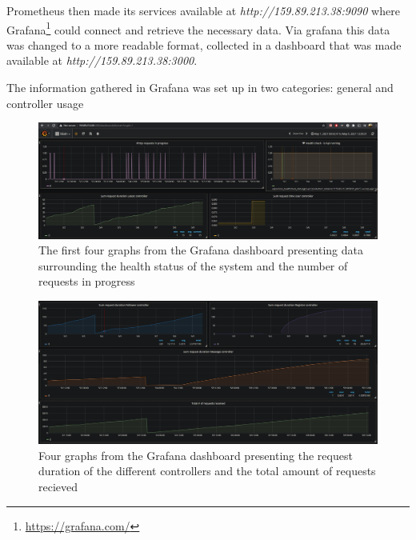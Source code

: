 \documentclass[report/main.tex]{subfiles}
\begin{document}
            Prometheus then made its services available at \textit{http://159.89.213.38:9090} where Grafana\footnote{\hyperlink{https://grafana.com/}{https://grafana.com/}} could connect and retrieve the necessary data. Via grafana this data was changed to a more readable format, collected in a dashboard that was made available at \textit{http://159.89.213.38:3000}.
            
            The information gathered in Grafana was set up in two categories: general and controller usage
                
            \begin{figure}[H]
                \centering
                \includegraphics[width=\textwidth]{report/images/Grafana EvilTwitter 1.jpg}
                \caption{The first four graphs from the Grafana dashboard presenting data surrounding the health status of the system and the number of requests in progress}
                \label{fig:grafana_setup_1}
            \end{figure}
                
            \begin{figure}[H]
                \centering
                \includegraphics[width=\textwidth]{report/images/Grafana EvilTwitter 2.jpg}
                \caption{Four graphs from the Grafana dashboard presenting the request duration of the different controllers and the total amount of requests recieved}
                \label{fig:grafana_setup_2}
            \end{figure}
            
\end{document}
